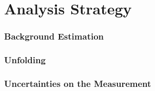 \part {\LARGE{Analysis Strategy}}
\label{sec:Analysis Strategy}

\section{Background Estimation}
\label{sec:Bkg}


\section{Unfolding}
\label{sec:Unfolding}


\section{Uncertainties on the Measurement}
\label{sec:Uncertainties}


